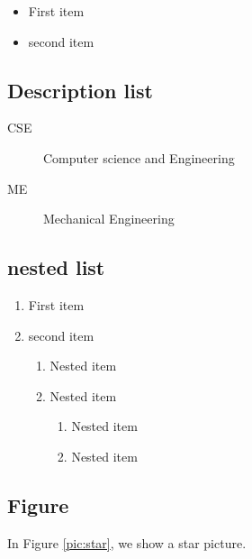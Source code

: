 \documentclass[letter, 12pt]{article}
\begin{document}
\begin{itemize}
	\item First item
	\item second item
\end{itemize}

\subsection{Description list}

\begin{description}
	\item[CSE] Computer science and Engineering
	\item[ME] Mechanical Engineering
\end{description}

\subsection{nested list}
	\begin{enumerate}
		\item First item
		\item second item
		\begin{enumerate}
			\item Nested item
			\item Nested item
			\begin{enumerate}
				\item Nested item
				\item Nested item			
			\end{enumerate}
		\end{enumerate}
	\end{enumerate}
	

\subsection{Figure}

In Figure \ref{pic:star}, we show a star picture. 
\end{document}
